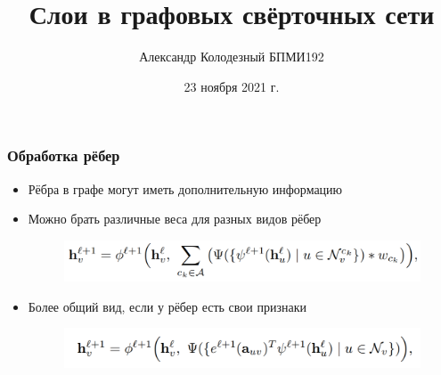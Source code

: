 \documentclass{beamer}
\title[Заголовок]{Слои в графовых свёрточных сети}
\author[Александр Колодезный]{Александр Колодезный БПМИ192}
\institute[Высшая школа экономики]{Национальный исследовательский университет \\ «Высшая школа экономики» (Москва)}
\date{23 ноября 2021 г.}
\begin{document}

\frame[plain]{\titlepage}	%




\begin{frame}
\frametitle{Обработка рёбер}
\begin{itemize}
	\item Рёбра в графе могут иметь дополнительную информацию
	\item Можно брать различные веса для разных видов рёбер
\begin{figure}
	\includegraphics[width=0.9\columnwidth]{edges1.png}
\end{figure}
	\item Более общий вид, если у рёбер есть свои признаки
\begin{figure}
	\includegraphics[width=0.9\columnwidth]{edges2.png}
\end{figure}
	
\end{itemize}
\end{frame}
\end{document}
